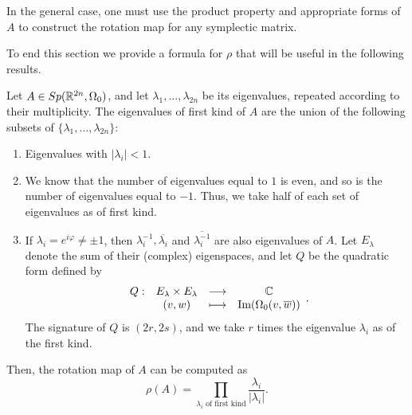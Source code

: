 In the general case, one must use the product property and appropriate forms of $A$ to construct the rotation map for any symplectic matrix.

To end this section we provide a formula for $\rho$ that will be useful in the following results.

\begin{lema} \label{rotationformula}
Let $A \in Sp(\mathbb{R}^{2n},\Omega_0)$, and let $\lambda_1,...,\lambda_{2n}$ be its eigenvalues, repeated according to their multiplicity. The eigenvalues of first kind of $A$ are the union of the following subsets of $\{\lambda_1,...,\lambda_{2n}\}$:
\begin{enumerate}
	\item Eigenvalues with $|\lambda_i| < 1$.
	\item We know that the number of eigenvalues equal to $1$ is even, and so is the number of eigenvalues equal to $-1$. Thus, we take half of each set of eigenvalues as of first kind.
	\item If $\lambda_i = e^{i \varphi} \neq \pm 1$, then $\lambda_i^{-1}, \overline{\lambda_i}$ and $\overline{\lambda_i^{-1}}$ are also eigenvalues of $A$. Let $E_{\lambda}$ denote the sum of their (complex) eigenspaces, and let $Q$ be the quadratic form defined by
	\[\begin{array}{rccc} Q : & E_{\lambda} \times E_{\lambda} & \longrightarrow & \mathbb{C} \\ & (v,w) & \longmapsto & \text{Im}(\Omega_0(v,\overline{w})) \end{array} .\]
	The signature of $Q$ is $(2r,2s)$, and we take $r$ times the eigenvalue $\lambda_i$ as of the first kind.
\end{enumerate}

Then, the rotation map of $A$ can be computed as
\[\rho(A) = \prod_{\lambda_i \text{ of first kind}} \frac{\lambda_i}{|\lambda_i|} .\]
\end{lema}
